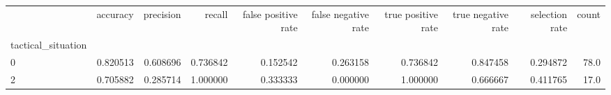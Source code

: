\begin{tabular}{lrrrrrrrrr}
\toprule
{} &  accuracy &  precision &    recall &  false positive rate &  false negative rate &  true positive rate &  true negative rate &  selection rate &  count \\
tactical\_situation &           &            &           &                      &                      &                     &                     &                 &        \\
\midrule
0                  &  0.820513 &   0.608696 &  0.736842 &             0.152542 &             0.263158 &            0.736842 &            0.847458 &        0.294872 &   78.0 \\
2                  &  0.705882 &   0.285714 &  1.000000 &             0.333333 &             0.000000 &            1.000000 &            0.666667 &        0.411765 &   17.0 \\
\bottomrule
\end{tabular}
